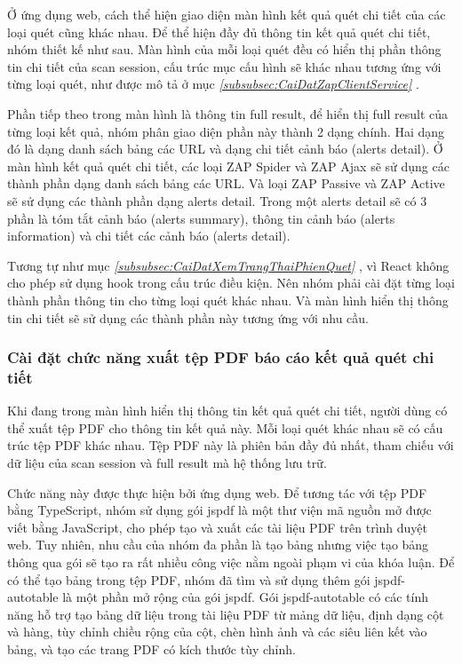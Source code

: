 Ở ứng dụng web, cách thể hiện giao diện màn hình kết quả quét chi tiết của các loại quét cũng khác nhau.
Để thể hiện đầy đủ thông tin kết quả quét chi tiết, nhóm thiết kế như sau.
Màn hình của mỗi loại quét đều có hiển thị phần thông tin chi tiết của scan session, cấu trúc mục cấu hình sẽ khác nhau tương ứng với từng loại quét, như được mô tả ở mục \textit{\ref{subsubsec:CaiDatZapClientService} }.

Phần tiếp theo trong màn hình là thông tin full result, để hiển thị full result của từng loại kết quả, nhóm phân giao diện phần này thành 2 dạng chính.
Hai dạng đó là dạng danh sách bảng các URL và dạng chi tiết cảnh báo (alerts detail).
Ở màn hình kết quả quét chi tiết, các loại ZAP Spider và ZAP Ajax sẽ sử dụng các thành phần dạng danh sách bảng các URL.
Và loại ZAP Passive và ZAP Active sẽ sử dụng các thành phần dạng alerts detail.
Trong một alerts detail sẽ có 3 phần là tóm tắt cảnh báo (alerts summary), thông tin cảnh báo (alerts information) và chi tiết các cảnh báo (alerts detail).

Tương tự như mục \textit{\ref{subsubsec:CaiDatXemTrangThaiPhienQuet} }, vì React không cho phép sử dụng hook trong cấu trúc điều kiện. Nên nhóm phải cài đặt từng loại thành phần thông tin cho từng loại quét khác nhau. Và màn hình hiển thị thông tin chi tiết sẽ sử dụng các thành phần này tương ứng với nhu cầu.

\subsubsection{Cài đặt chức năng xuất tệp PDF báo cáo kết quả quét chi tiết} \label{subsubsec:CaiDatChucNangXuatTepPDF}

\tab Khi đang trong màn hình hiển thị thông tin kết quả quét chi tiết, người dùng có thể xuất tệp PDF cho thông tin kết quả này.
Mỗi loại quét khác nhau sẽ có cấu trúc tệp PDF khác nhau.
Tệp PDF này là phiên bản đầy đủ nhất, tham chiếu với dữ liệu của scan session và full result mà hệ thống lưu trữ.

Chức năng này được thực hiện bởi ứng dụng web.
Để tương tác với tệp PDF bằng TypeScript, nhóm sử dụng gói jspdf là một thư viện mã nguồn mở được viết bằng JavaScript, cho phép tạo và xuất các tài liệu PDF trên trình duyệt web.
Tuy nhiên, nhu cầu của nhóm đa phần là tạo bảng nhưng việc tạo bảng thông qua gói sẽ tạo ra rất nhiều công việc nằm ngoài phạm vi của khóa luận.
Để có thể tạo bảng trong tệp PDF, nhóm đã tìm và sử dụng thêm gói jspdf-autotable là một phần mở rộng của gói jspdf.
Gói jspdf-autotable có các tính năng hỗ trợ tạo bảng dữ liệu trong tài liệu PDF từ mảng dữ liệu, định dạng cột và hàng, tùy chỉnh chiều rộng của cột, chèn hình ảnh và các siêu liên kết vào bảng, và tạo các trang PDF có kích thước tùy chỉnh.

